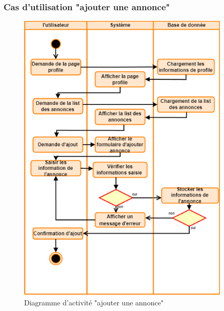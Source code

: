 \documentclass[edit,12pt,a4paper,ChapStyle,oneside,doubleinterligne]{report}
\begin{document}
\subsubsection{Cas d'utilisation "ajouter une annonce"}
\begin{figure}[h!]\label{fig:activite ajoutera}
    \centering
    \includegraphics[width=0.9\textwidth]{images/activite Ajouter annonce.png}
    \caption{Diagramme d'activité "ajouter une annonce"}
\end{figure}
\clearpage
\end{document}

